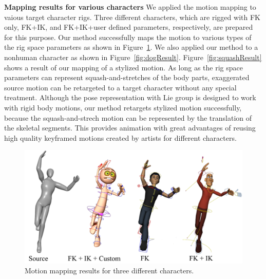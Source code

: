
%

\textbf{Mapping results for various characters}
We applied the motion mapping to vaious target character rigs. Three different characters, which are rigged with FK only, FK+IK, and FK+IK+user defined parameters, respectively, are prepared for this purpose. Our method successfully maps the motion to various types of the rig space parameters as shown in Figure~\ref{fig:variousResult}. 
We also applied our method to a nonhuman character as shown in Figure~\ref{fig:dogResult}.
Figure~\ref{fig:squashResult} shows a result of our mapping of a stylized motion. As long as the rig space parameters can represent squash-and-stretches of the body parts, exaggerated source motion can be retargeted to a target character without any special treatment.
Although the pose representation with Lie group \SE{} is designed to work with rigid body motions, our method retargets stylized motion successfully, because the squash-and-strech motion can be represented by the translation of the skeletal segments.
This provides animation with great advantages of reusing high quality keyframed motions created by artists for different characters.

\begin{figure}[ht]
  \centering
  \includegraphics[width=1.0\linewidth]{images/various}
  \caption{Motion mapping results for three different characters.}
  \label{fig:variousResult}
\end{figure}

